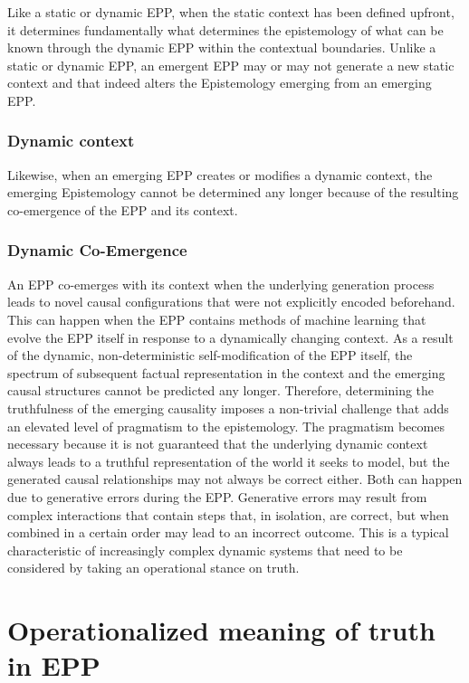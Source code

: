 \documentclass{article}
\begin{document}
Like a static or dynamic EPP, when the static context has been defined upfront, it determines fundamentally what determines the epistemology of what can be known through the dynamic EPP within the contextual boundaries. Unlike a static or dynamic EPP, an emergent EPP may or may not generate a new static context and that indeed alters the Epistemology emerging from an emerging EPP. 

\subsubsection{Dynamic context}

Likewise, when an emerging EPP creates or modifies a dynamic context, the emerging Epistemology cannot be determined any longer because of the resulting co-emergence of the EPP and its context.

\subsubsection{Dynamic Co-Emergence}

An EPP co-emerges with its context when the underlying generation process leads to novel causal configurations that were not explicitly encoded beforehand. This can happen when the EPP contains methods of machine learning that evolve the EPP itself in response to a dynamically changing context. As a result of the dynamic, non-deterministic self-modification of the EPP itself, the spectrum of subsequent factual representation in the context and the emerging causal structures cannot be predicted any longer.
Therefore, determining the truthfulness of the emerging causality imposes a non-trivial challenge that adds an elevated level of pragmatism to the epistemology. The pragmatism becomes necessary because it is not guaranteed that the underlying dynamic context always leads to a truthful representation of the world it seeks to model, but the generated causal relationships may not always be correct either. Both can happen due to generative errors during the EPP. Generative errors may result from complex interactions that contain steps that, in isolation, are correct, but when combined in a certain order may lead to an incorrect outcome. This is a typical characteristic of increasingly complex dynamic systems that need to be considered by taking an operational stance on truth.

\section{Operationalized meaning of truth in EPP}
\label{sec:Operationalized_Truth}
\end{document}
